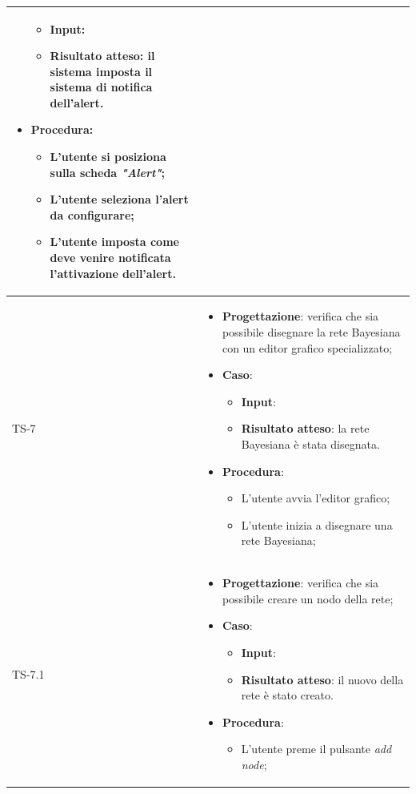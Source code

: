 \begin{longtable}{|C{2.5cm}|C{13cm}|}
\begin{itemize}
\begin{itemize}
		\item \textbf{Input}: 
		\item \textbf{Risultato atteso}: il sistema imposta il sistema di notifica dell'alert.
	\end{itemize}
	\item \textbf{Procedura}:
	\begin{itemize}
		\item L'utente si posiziona sulla scheda \emph{"Alert"};
		\item L'utente seleziona l'alert da configurare;
		\item L'utente imposta come deve venire notificata l'attivazione dell'alert.
	\end{itemize} 
\end{itemize}
	 \\
	\hline
	{TS-7} & 
\begin{itemize}
	\item \textbf{Progettazione}: verifica che sia possibile disegnare la rete
	Bayesiana con un editor grafico specializzato;
	\item \textbf{Caso}: 
	\begin{itemize}
		\item \textbf{Input}:
		\item \textbf{Risultato atteso}: la rete Bayesiana è stata disegnata.
	\end{itemize}
	\item \textbf{Procedura}:
	\begin{itemize}
		\item L'utente avvia l'editor grafico;
		\item L'utente inizia a disegnare una rete Bayesiana;
	\end{itemize} 
\end{itemize} \\
\hline
	{TS-7.1} & 
\begin{itemize}
	\item \textbf{Progettazione}: verifica che sia possibile creare un nodo
	della rete;
	\item \textbf{Caso}: 
	\begin{itemize}
		\item \textbf{Input}:
		\item \textbf{Risultato atteso}: il nuovo della rete è stato creato.
	\end{itemize}
	\item \textbf{Procedura}:
	\begin{itemize}
		\item L'utente preme il pulsante \emph{add node};

\end{itemize}
\end{itemize}
\end{longtable}
